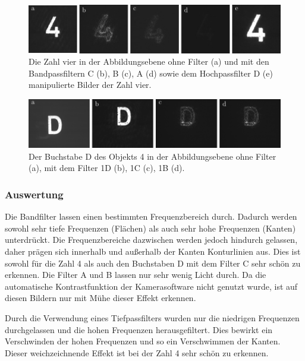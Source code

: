 \begin{figure}[h]
	\centering
	\includegraphics{images/Regina/abb22.pdf}
	\caption[Zahl 4 mit Breitbandfiltern]{
		Die Zahl vier in  der Abbildungsebene ohne Filter (a) und mit den Bandpassfiltern C (b), B (c), A (d) sowie dem Hochpassfilter D (e) manipulierte Bilder der Zahl vier.
	}
	\label{fig:vier_mit_breitband}
\end{figure}

\begin{figure}[h]
	\centering
	\includegraphics{images/ergebniss_D/abb.pdf}
	\caption{
		Der Buchstabe D des Objekts 4 in der Abbildungsebene ohne Filter (a), mit dem Filter 1D (b), 1C (c), 1B (d).
	}
	\label{fig:example10_D_filter}
\end{figure}


\subsubsection*{Auswertung}

Die Bandfilter lassen einen bestimmten Frequenzbereich durch. Dadurch werden sowohl sehr tiefe Frequenzen (Flächen) als auch sehr hohe Frequenzen (Kanten) unterdrückt. Die Frequenzbereiche dazwischen werden jedoch hindurch gelassen, daher prägen sich innerhalb und außerhalb der Kanten Konturlinien aus. Dies ist sowohl für die Zahl 4 als auch den Buchstaben D mit dem Filter C sehr schön zu erkennen. Die Filter A und B lassen nur sehr wenig Licht durch. Da die automatische Kontrastfunktion der Kamerasoftware nicht genutzt wurde, ist auf diesen Bildern nur mit Mühe dieser Effekt erkennen.

Durch die Verwendung eines Tiefpassfilters wurden nur die niedrigen Frequenzen durchgelassen und die hohen Frequenzen herausgefiltert. Dies bewirkt ein Verschwinden der hohen Frequenzen und so ein Verschwimmen der Kanten. Dieser weichzeichnende Effekt ist bei der Zahl 4 sehr schön zu erkennen.

